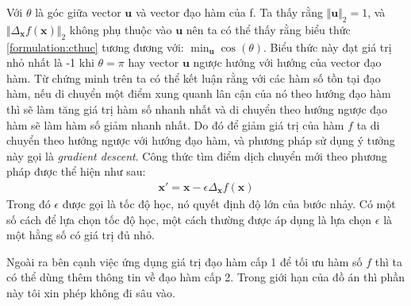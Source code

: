 \documentclass[fontsize=12pt]{scrartcl}
\begin{document}
Với $\theta$ là góc giữa vector $\boldsymbol{u}$ và vector đạo hàm của f. Ta thấy rằng $\Vert\boldsymbol{u}\Vert_2 = 1$, và  $\Vert\Delta_{\boldsymbol{x}}f(\boldsymbol{x})\Vert_2$ không phụ thuộc vào $\boldsymbol{u}$ nên ta có thể thấy rằng biểu thức \ref{formulation:cthuc} tương đương với: $\min_{\boldsymbol{u}}\cos(\theta)$. Biểu thức này đạt giá trị nhỏ nhất là -1 khi $\theta=\pi$ hay vector $\boldsymbol{u}$ ngược hướng với hướng của vector đạo hàm. Từ chứng minh trên ta có thể kết luận rằng với các hàm số tồn tại đạo hàm, nếu di chuyển một điểm xung quanh lân cận của nó theo hướng đạo hàm thì sẽ làm tăng giá trị hàm số nhanh nhất và di chuyển theo hướng ngược đạo hàm sẽ làm hàm số giảm nhanh nhất. Do đó để giảm giá trị của hàm $f$ ta di chuyển theo hướng ngược với hướng đạo hàm, và phương pháp sử dụng ý tưởng này gọi là \textit{gradient descent}. Công thức tìm điểm dịch chuyển mới theo phương pháp được  thể hiện như sau:
\begin{align}
\boldsymbol{x'} = \boldsymbol{x} - \epsilon\Delta_{\boldsymbol{x}}f(\boldsymbol{x})
\end{align}
Trong đó $\epsilon$ được gọi là tốc độ học, nó quyết định độ lớn của bước nhảy. Có một số cách để lựa chọn tốc độ học, một cách thường được áp dụng là lựa chọn $\epsilon$ là một hằng số có giá trị đủ nhỏ.
\par
Ngoài ra bên cạnh việc ứng dụng giá trị đạo hàm cấp 1 để tối ưu hàm số $f$ thì ta có thể dùng thêm thông tin về đạo hàm cấp 2. Trong giới hạn của đồ án thì phần này tôi xin phép không đi sâu vào.
\end{document}
